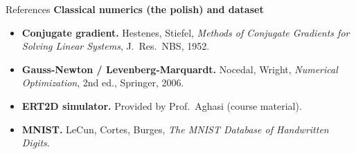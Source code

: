 \documentclass[aspectratio=169,10pt]{beamer}
\begin{document}
\begin{frame}{References}
\textbf{Classical numerics (the polish) and dataset}
\begin{itemize}\itemsep=1pt
\item \textbf{Conjugate gradient.} Hestenes, Stiefel, \emph{Methods of
Conjugate Gradients for Solving Linear Systems}, J.~Res.~NBS, 1952.
\item \textbf{Gauss-Newton / Levenberg-Marquardt.} Nocedal, Wright,
\emph{Numerical Optimization}, 2nd ed., Springer, 2006.
\item \textbf{ERT2D simulator.} Provided by Prof.~Aghasi (course material).
\item \textbf{MNIST.} LeCun, Cortes, Burges, \emph{The MNIST Database of
Handwritten Digits}.
\end{itemize}
\end{frame}
\end{document}
